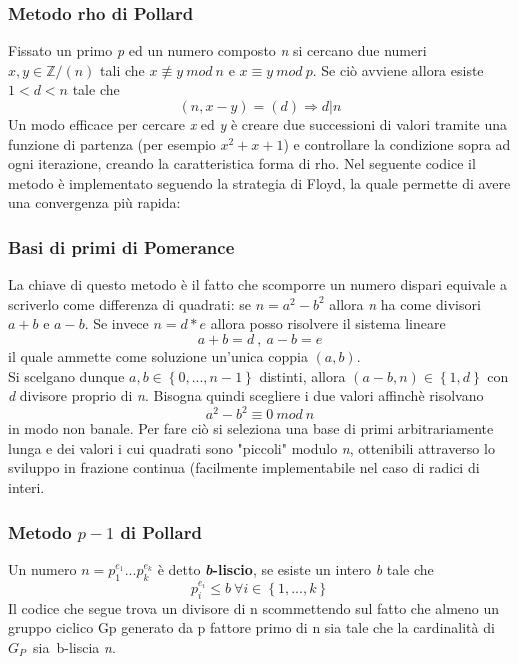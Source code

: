 \documentclass{article}
\begin{document}
	\subsubsection{Metodo rho di Pollard}
	Fissato un primo \textit{p} ed un numero composto \textit{n} si cercano due numeri \(x,y\in\mathbb{Z}/(n)\) tali che \(x\not\equiv y\ mod\ n\) e \(x\equiv y\ mod\ p\). Se ciò avviene allora esiste \(1<d<n\) tale che \[(n,x-y)=(d)\Rightarrow d|n\]
	Un modo efficace per cercare \textit{x} ed \textit{y} è creare due successioni di valori tramite una funzione di partenza (per esempio \(x^2+x+1\)) e controllare la condizione sopra ad ogni iterazione, creando la caratteristica forma di rho. Nel seguente codice il metodo è implementato seguendo la strategia di Floyd, la quale permette di avere una convergenza più rapida: 
	\vspace{1cm}
	
	\vspace{1cm}
	\subsubsection{Basi di primi di Pomerance}
	La chiave di questo metodo è il fatto che scomporre un numero dispari equivale a scriverlo come differenza di quadrati: se \(n=a^2-b^2\) allora \textit{n} ha come divisori \(a+b\) e \(a-b\). Se invece \(n=d*e\) allora posso risolvere il sistema lineare 
	\[a+b=d\ ,\ a-b=e\]
	il quale ammette come soluzione un'unica coppia \((a,b)\).\\ 
	Si scelgano dunque \(a,b\in\left\{0,...,n-1\right\}\) distinti, allora \((a-b,n)\in\left\{1,d\right\}\) con \textit{d} divisore proprio di \textit{n}.
	Bisogna quindi scegliere i due valori affinchè risolvano 
	\[a^2-b^2\equiv 0\ mod\ n \] in modo non banale.
	Per fare ciò si seleziona una base di primi arbitrariamente lunga e dei valori i cui quadrati sono "piccoli" modulo \textit{n}, ottenibili attraverso lo sviluppo in frazione continua (facilmente implementabile nel caso di radici di interi. 
	
	\vspace{1cm}
	
	\vspace{1cm}\vspace{1cm}
	
	\subsubsection{Metodo \(p-1\) di Pollard}
	Un numero \(n=p_1^{e_1}...p_k^{e_k}\) è detto \textbf{\textit{b}-liscio}, se esiste un intero \textit{b} tale che \[p_i^{e_i}\le b\ \forall i\in\left\{1,...,k\right\}\]
	Il codice che segue trova un divisore di n scommettendo sul fatto che almeno un gruppo ciclico Gp generato da p fattore primo di n sia tale che la cardinalità di $G_P$ sia b-liscia \textit{n}.
	\vspace{1cm}
	
	\vspace{1cm}\vspace{1cm}
\end{document}
